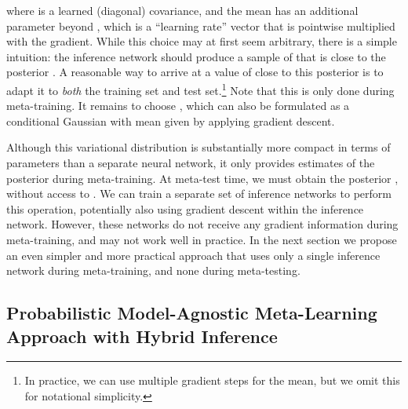 \documentclass{article}
\begin{document}
where  is a learned (diagonal) covariance, and the mean has an additional parameter beyond , which is a ``learning rate'' vector  that is pointwise multiplied with the gradient.
While this choice may at first seem arbitrary, there is a simple intuition: the inference network should produce a sample of  that is close to the posterior . A reasonable way to arrive at a value of  close to this posterior is to adapt it to \emph{both} the training set and test set.\footnote{In practice, we can use multiple gradient steps for the mean, but we omit this for notational simplicity.} Note that this is only done during meta-training.
It remains to choose , which can also be formulated as a conditional Gaussian with mean given by applying gradient descent.

Although this variational distribution is substantially more compact in terms of parameters than a separate neural network, it only provides estimates of the posterior during meta-training. At meta-test time, we must obtain the posterior , without access to . We can train a separate set of inference networks to perform this operation, potentially also using gradient descent within the inference network. However, these networks do not receive any gradient information during meta-training, and may not work well in practice.
In the next section we propose an even simpler and more practical approach that uses only a single inference network during meta-training, and none during meta-testing.

\subsection{Probabilistic Model-Agnostic Meta-Learning Approach with Hybrid Inference}
\vspace{-0.2cm}


\iffalse
\begin{algorithm}[h]
    \caption{Model-Agnostic Meta-Learning~\cite{finn2017model}}
    \small
    \label{alg:maml}
    \begin{algorithmic}[1]
    \Require : distribution over tasks
    \Require : step size hyperparameter
    \State randomly initialize 
    \While{not done}
    \State Sample batch of tasks 
      \ForAll{}
    \State 
     \State Evaluate 
     \State Compute adapted parameters with gradient descent: 
     \EndFor
     \State Compute 
     \State Update  using Adam
    \EndWhile
\end{algorithmic}
\end{algorithm}
\fi
\end{document}

